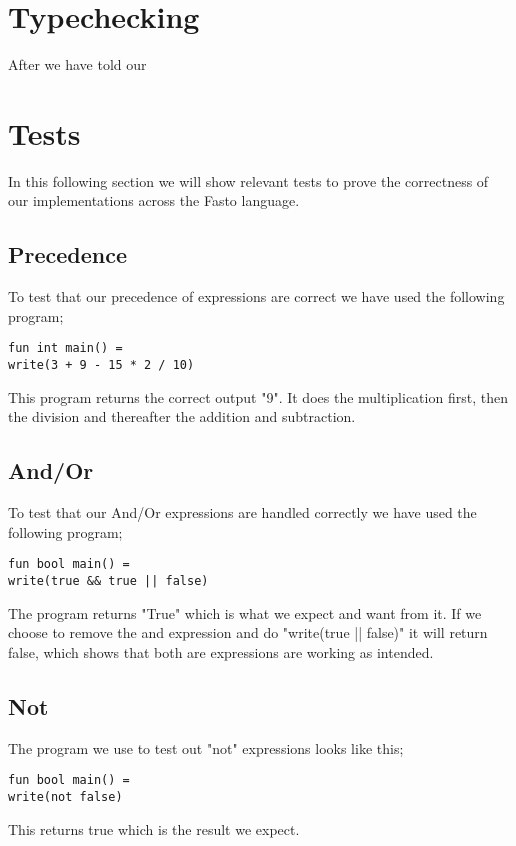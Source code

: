 \documentclass[12pt]{article}
\begin{document}
\section{Typechecking}
After we have told our
\pagebreak
\section{Tests}
In this following section we will show relevant tests to prove the correctness of our implementations across the Fasto language.
\subsection{Precedence}
To test that our precedence of expressions are correct we have used the following program;
\begin{verbatim}
fun int main() =
write(3 + 9 - 15 * 2 / 10)
\end{verbatim}
This program returns the correct output "9". It does the multiplication first, then the division and thereafter the addition and subtraction.
\subsection{And/Or}
To test that our And/Or expressions are handled correctly we have used the following program;
\begin{verbatim}
fun bool main() =
write(true && true || false)
\end{verbatim}
The program returns "True" which is what we expect and want from it. If we choose to remove the and expression and do "write(true || false)" it will return false, which shows that both are expressions are working as intended.
\subsection{Not}
The program we use to test out "not" expressions looks like this;
\begin{verbatim}
fun bool main() =
write(not false)
\end{verbatim}
This returns true which is the result we expect.
\end{document}
